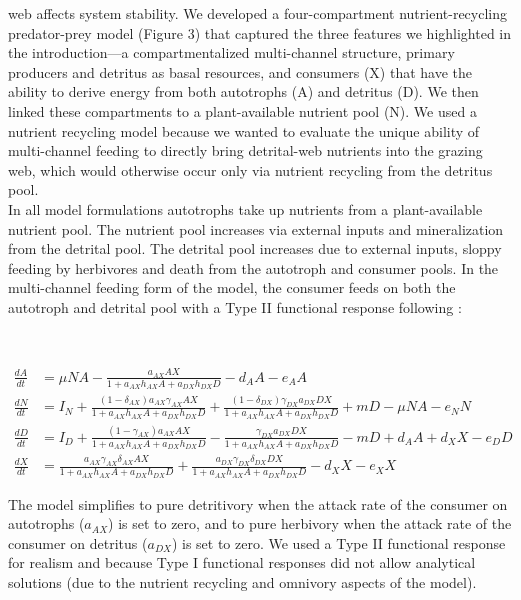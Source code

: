 \documentclass[12pt,a4paper,oneside]{article}
\begin{document}
web affects system stability. We developed a four-compartment
nutrient-recycling predator-prey model (Figure 3) that captured the three features we highlighted in the introduction---a compartmentalized multi-channel structure, primary producers and detritus as basal resources, and consumers (X)
that have the ability to derive energy from both autotrophs (A) and detritus (D). We then linked these compartments to a
plant-available nutrient pool (N). We used a nutrient recycling model because we wanted to evaluate the unique ability of multi-channel feeding to directly bring detrital-web nutrients into the grazing web, which would otherwise occur only via nutrient recycling from the detritus pool. 
\\
\indent In all model formulations autotrophs take up nutrients from a
plant-available nutrient pool. The nutrient pool increases via external
inputs and mineralization from the detrital pool. The detrital pool
increases due to external inputs, sloppy feeding by herbivores and death
from the autotroph and consumer pools. In the multi-channel feeding form of
the model, the consumer feeds on both the autotroph and detrital pool with a Type II functional response
following \cite{Chesson:1983}:

\\
\begin{small}
\begin{align*}
 \frac{dA}{dt} &=\mu NA- \frac{a_{AX}AX}{1+a_{AX}h_{AX}A+a_{DX}h_{DX}D} - d_{A}A- e_{A}A  
\\[2em]
 \frac{dN}{dt} &= I_{N} +
 \frac{(1-\delta_{AX})a_{AX}\gamma_{AX}AX}{1+a_{AX}h_{AX}A+a_{DX}h_{DX}D}
 +
 \frac{(1-\delta_{DX})\gamma_{DX}a_{DX}DX}{1+a_{AX}h_{AX}A+a_{DX}h_{DX}D}+
 mD -\mu NA- e_{N}N
\\[2em]
 \frac{dD}{dt} &= I_{D} +
 \frac{(1-\gamma_{AX})a_{AX}AX}{1+a_{AX}h_{AX}A+a_{DX}h_{DX}D} -
 \frac{\gamma_{DX}a_{DX}DX}{1+a_{AX}h_{AX}A+a_{DX}h_{DX}D} - mD + d_{A}A +
 d_{X}X - e_{D}D
\\[2em]
 \frac{dX}{dt} &=
 \frac{a_{AX}\gamma_{AX}\delta_{AX}AX}{1+a_{AX}h_{AX}A+a_{DX}h_{DX}D} +
 \frac{a_{DX}\gamma_{DX}\delta_{DX}DX}{1+a_{AX}h_{AX}A+a_{DX}h_{DX}D}- d_{X}X - e_{X}X
\end{align*}
\end{small}

\noindent The model simplifies to pure detritivory when the attack rate
of the consumer on autotrophs (\(a_{AX}\)) is
set to zero, and to pure herbivory when the attack rate
of the consumer on detritus (\(a_{DX}\)) is
set to zero. We used a Type II functional response for realism and because Type I functional responses did not allow analytical solutions (due to the nutrient recycling and omnivory aspects of the model).
\end{document}
